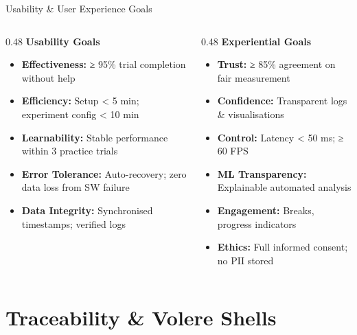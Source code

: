 \documentclass[aspectratio=169, 10pt]{beamer}
\begin{document}
\begin{frame}{Usability \& User Experience Goals}
  \begin{columns}[T]
    \begin{column}{0.48\textwidth}
      \textbf{Usability Goals}
      \begin{itemize}
        \item \textbf{Effectiveness:} ≥ 95\% trial completion without help
        \item \textbf{Efficiency:} Setup < 5 min; experiment config < 10 min
        \item \textbf{Learnability:} Stable performance within 3 practice trials
        \item \textbf{Error Tolerance:} Auto-recovery; zero data loss from SW failure
        \item \textbf{Data Integrity:} Synchronised timestamps; verified logs
      \end{itemize}
    \end{column}
    \begin{column}{0.48\textwidth}
      \textbf{Experiential Goals}
      \begin{itemize}
        \item \textbf{Trust:} ≥ 85\% agreement on fair measurement
        \item \textbf{Confidence:} Transparent logs \& visualisations
        \item \textbf{Control:} Latency < 50 ms; ≥ 60 FPS
        \item \textbf{ML Transparency:} Explainable automated analysis
        \item \textbf{Engagement:} Breaks, progress indicators
        \item \textbf{Ethics:} Full informed consent; no PII stored
      \end{itemize}
    \end{column}
  \end{columns}
\end{frame}

\section{Traceability \& Volere Shells}
\end{document}

